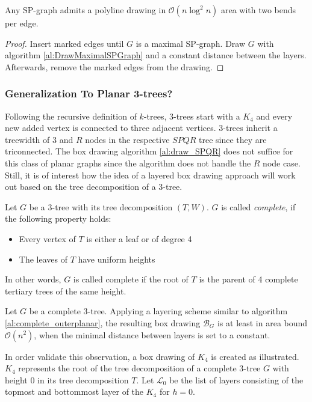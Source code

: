 \begin{theorem}
	Any SP-graph admits a polyline drawing in $\mathcal{O}(n \log^2 n)$ area with two bends per edge.
\end{theorem}
\begin{proof}
	Insert marked edges until $G$ is a maximal SP-graph. Draw $G$ with algorithm \ref{al:DrawMaximalSPGraph} and a constant distance between the layers. Afterwards, remove the marked edges from the drawing.
\end{proof}

\subsubsection{Generalization To Planar 3-trees?}
Following the recursive definition of $k$-trees, 3-trees start with a $K_4$ and every new added vertex is connected to three adjacent vertices. 3-trees inherit a treewidth of 3 and $R$ nodes in the respective $SPQR$ tree since they are triconnected. The box drawing algorithm \ref{al:draw_SPQR} does not suffice for this class of planar graphs since the algorithm does not handle the $R$ node case. Still, it is of interest how the idea of a layered box drawing approach will work out based on the tree decomposition of a 3-tree.

\begin{definition}
	Let $G$ be a 3-tree with its tree decomposition $(T,W)$. $G$ is called \emph{complete}, if the following property holds:
	\begin{itemize}
		\item Every vertex of $T$ is either a leaf or of degree 4
		\item The leaves of $T$ have uniform heights
	\end{itemize}
	In other words, $G$ is called complete if the root of $T$ is the parent of 4 complete tertiary trees of the same height.
\end{definition}

\begin{observation}
	Let $G$ be a complete 3-tree. Applying a layering scheme similar to algorithm \ref{al:complete_outerplanar}, the resulting box drawing $\mathcal{B}_G$ is at least in area bound $\mathcal{O}(n^2)$, when the minimal distance between layers is set to a constant.
\end{observation}

In order validate this observation, a box drawing of $K_4$ is created as illustrated. $K_4$ represents the root of the tree decomposition of a complete 3-tree $G$ with height 0 in its tree decomposition $T$. Let $\mathcal{L}_0$ be the list of layers consisting of the topmost and bottommost layer of the $K_4$ for $h=0$.

